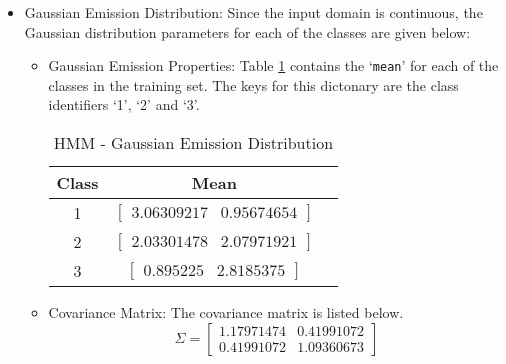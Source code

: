 \documentclass[parskip=half]{scrartcl}
\begin{document}
\begin{itemize}
            \item 
            Gaussian Emission Distribution: Since the input domain is continuous, the Gaussian distribution parameters for each of the classes are given below:
                \begin{itemize}

                    \item 
                    Gaussian Emission Properties: Table \ref{tab:hmm_gaussian_emission_distribution} contains the `\texttt{mean}' for each of the classes in the training set. The keys for this dictonary are the class identifiers `1', `2' and `3'.
                    \begin{table}[ht]
                        \centering
                        \begin{tabular}{| c | c | c |}
                        \hline
                        \textbf{Class} & \textbf{Mean}\\
                        \hline
                        \hline
                            1 & $\begin{bmatrix}3.06309217 & 0.95674654\end{bmatrix}$ \\
                        \hline
                            2 & $\begin{bmatrix}2.03301478 & 2.07971921\end{bmatrix}$ \\
                        \hline
                            3 & $\begin{bmatrix}0.895225 & 2.8185375\end{bmatrix}$ \\
                        \hline
                        \end{tabular}
                        \caption{HMM - Gaussian Emission Distribution}
                        \label{tab:hmm_gaussian_emission_distribution}
                    \end{table}
                    \item 
                    Covariance Matrix: The covariance matrix is listed below. 
                    $$\Sigma = 
                        \begin{bmatrix}
                            1.17971474 & 0.41991072 \\
                            0.41991072 & 1.09360673 
                        \end{bmatrix}$$

                \end{itemize}

        \end{itemize}
\end{document}
